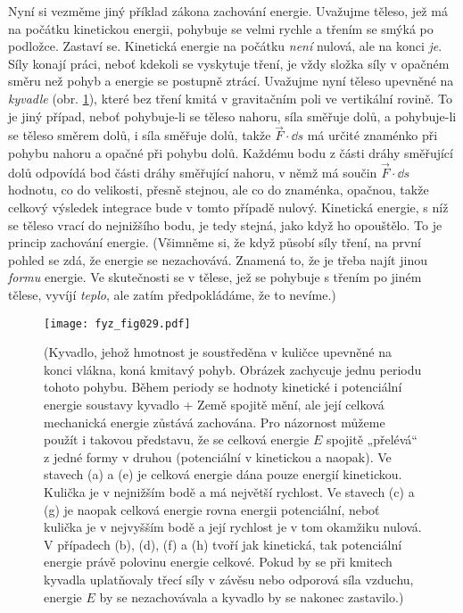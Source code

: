 {    Nyní si vezměme jiný příklad zákona zachování energie. Uvažujme těleso, jež má na počátku 
    kinetickou energii, pohybuje se velmi rychle a třením se smýká po podložce. Zastaví se. 
    Kinetická energie na počátku \emph{není} nulová, ale na konci \emph{je}. Síly konají práci, 
    neboť kdekoli se vyskytuje tření, je vždy složka síly v opačném směru než pohyb a energie se 
    postupně ztrácí. Uvažujme nyní těleso upevněné na \emph{kyvadle} (obr. \ref{fyz:fig029}), které 
    bez tření kmitá v gravitačním poli ve vertikální rovině. To je jiný případ, neboť pohybuje-li 
    se těleso nahoru, síla směřuje dolů, a pohybuje-li se těleso směrem dolů, i síla směřuje dolů, 
    takže \(\vec{F}\cdot\dd{s}\) má určité znaménko při pohybu nahoru a opačné při pohybu dolů. 
    Každému bodu z části dráhy směřující dolů odpovídá bod části dráhy směřující nahoru, v němž má 
    součin \(\vec{F}\cdot\dd{s}\) hodnotu, co do velikosti, přesně stejnou, ale co do znaménka, 
    opačnou, takže celkový výsledek integrace bude v tomto případě nulový. Kinetická energie, s níž 
    se těleso vrací do nejnižšího bodu, je tedy stejná, jako když ho opouštělo. To je princip 
    zachování energie. (Všimněme si, že když působí síly tření, na první pohled se zdá, že energie 
    se nezachovává. Znamená to, že je třeba najít jinou \emph{formu} energie. Ve skutečnosti se v 
    tělese, jež se pohybuje s třením po jiném tělese, vyvíjí \emph{teplo}, ale zatím předpokládáme, 
    že to nevíme.)
    \begin{figure}[ht!]  %
      \centering
      \texttt{[image: fyz\_fig029.pdf]}
      \caption{ (Kyvadlo, jehož hmotnost je soustředěna v kuličce upevněné na konci vlákna, koná 
                 kmitavý pohyb. Obrázek zachycuje jednu periodu tohoto pohybu. Během periody se 
                 hodnoty kinetické i potenciální energie soustavy kyvadlo + Země spojitě mění, ale 
                 její celková mechanická energie zůstává zachována. Pro názornost můžeme použít i 
                 takovou představu, že se celková energie \(E\) spojitě „přelévá“ z jedné formy v 
                 druhou (potenciální v kinetickou a naopak). Ve stavech (a) a (e) je celková  
                 energie dána pouze energií kinetickou. Kulička je v nejnižším bodě a má největší 
                 rychlost. Ve stavech (c) a (g) je naopak celková energie rovna energii 
                 potenciální, neboť kulička je v nejvyšším bodě a její rychlost je v tom okamžiku  
                 nulová. V případech (b), (d), (f) a (h) tvoří jak kinetická, tak potenciální    
                 energie právě polovinu energie celkové. Pokud by se při kmitech kyvadla 
                 uplatňovaly třecí síly v závěsu nebo odporová síla vzduchu, energie \(E\) by se 
                 nezachovávala a kyvadlo by se nakonec zastavilo.\cite[s.~177]{Halliday2001})}
      \label{fyz:fig029}
    \end{figure}
    
}
